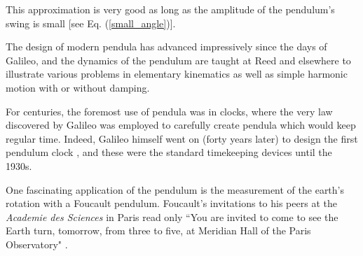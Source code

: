 \documentclass[12pt,twoside]{reedthesis}
\begin{document}

This approximation is very good as long as the amplitude of the pendulum's swing is small [see Eq. (\ref{small_angle})].  

The design of modern pendula has advanced impressively since the days of Galileo, and the dynamics of the pendulum are taught at Reed and elsewhere to illustrate various problems in elementary kinematics as well as simple harmonic motion with or without damping.  


For centuries, the foremost use of pendula was in clocks, where the very law discovered by Galileo was employed to carefully create pendula which would keep regular time.  Indeed, Galileo himself went on (forty years later) to design the first pendulum clock \cite{murdin2009}, and these were the standard timekeeping devices until the 1930s.  




One fascinating application of the pendulum is the measurement of the earth's rotation with a Foucault pendulum.  Foucault's invitations to his peers at the \textit{Academie des Sciences} in Paris read only ``You are invited to come to see the Earth turn, tomorrow, from three to five, at Meridian Hall of the Paris Observatory" \cite{matthews2005}. 
\end{document}
